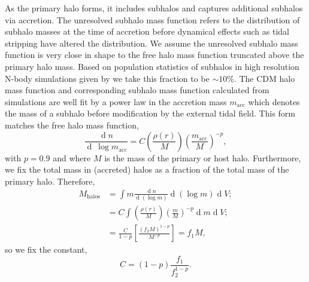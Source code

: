 \documentclass[usenatbib]{mnras}
\renewcommand{\d}[1]{\! \mathrm{d}#1 \:}
\newcommand{\deriv}[2]{\frac{\d{#1}}{\d{#2}}}
\renewcommand{\d}[1]{\ensuremath{\operatorname{d}\!{#1}}}
\begin{document}
As the primary halo forms, {\color{magenta} it includes subhalos and captures additional subhalos via accretion.} The unresolved subhalo mass function refers to the distribution of subhalo masses at the time of accretion before dynamical effects such as tidal stripping have altered the distribution. We assume the unresolved subhalo mass function is very close in shape to the free halo mass function truncated above the primary halo mass. Based on population statistics of subhalos in high resolution N-body simulations given by \citet{subhalo_abundance} we take this fraction to be $\sim 10\%$. The CDM halo mass function and corresponding subhalo mass function calculated from simulations \citep{pop_of_subhalos, unified_model} are well fit by a power law in the accretion mass $m_{\text{acc}}$ which denotes the mass of a subhalo before modification by the external tidal field. This form matches the free halo mass function, 
\begin{equation}
\frac{\d{n}}{\d{\: \log{m_{\text{acc}}}}} = C \left(\frac{\rho(r)}{M}\right) \left(\frac{m_{\text{acc}}}{M} \right)^{-p} ,
\end{equation}
with $p = 0.9$ and where $M$ is the mass of the primary or host halo.
Furthermore, we fix the total mass in (accreted) halos as a fraction of the total mass of the primary halo. Therefore,
\begin{subequations}
\begin{align}
M_{\mathrm{halos}} & = \int m \deriv{n}{(\log{m})} \d{(\log{m})} \d{V} ;
\\
& = C \int \left(\frac{\rho(r)}{M}\right) \left(\frac{m}{M} \right)^{-p} \d{m} \d{V} ;
\\
& = \frac{C}{1-p} \left[ \frac{(f_2 M)^{1-p}}{M^{-p}} \right] = f_1 M ,
\end{align} 
\end{subequations}
so we fix the constant,
\begin{equation}
C = (1 - p)\frac{f_1}{f_2^{1-p}} .
\end{equation}
\end{document}
